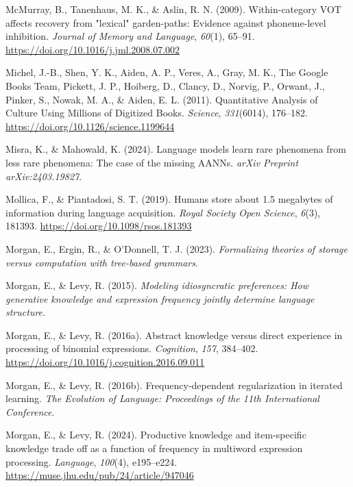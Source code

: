 \documentclass[
  12pt,
  letterpaper,
]{scrreprt}
\newlength{\cslhangindent}
\newenvironment{CSLReferences}[2] %
 {\begin{list}{}{%
  \setlength{\itemindent}{0pt}
  \setlength{\leftmargin}{0pt}
  \setlength{\parsep}{0pt}
  \ifodd #1
   \setlength{\leftmargin}{\cslhangindent}
   \setlength{\itemindent}{-1\cslhangindent}
  \fi
  \setlength{\itemsep}{#2\baselineskip}}}
 {\end{list}}
\begin{document}
\begin{CSLReferences}{1}{0}
McMurray, B., Tanenhaus, M. K., \& Aslin, R. N. (2009). Within-category
VOT affects recovery from {"}lexical{"} garden-paths: Evidence against
phoneme-level inhibition. \emph{Journal of Memory and Language},
\emph{60}(1), 65--91. \url{https://doi.org/10.1016/j.jml.2008.07.002}

Michel, J.-B., Shen, Y. K., Aiden, A. P., Veres, A., Gray, M. K., The
Google Books Team, Pickett, J. P., Hoiberg, D., Clancy, D., Norvig, P.,
Orwant, J., Pinker, S., Nowak, M. A., \& Aiden, E. L. (2011).
Quantitative Analysis of Culture Using Millions of Digitized Books.
\emph{Science}, \emph{331}(6014), 176--182.
\url{https://doi.org/10.1126/science.1199644}

Misra, K., \& Mahowald, K. (2024). Language models learn rare phenomena
from less rare phenomena: The case of the missing AANNs. \emph{arXiv
Preprint arXiv:2403.19827}.

Mollica, F., \& Piantadosi, S. T. (2019). Humans store about 1.5
megabytes of information during language acquisition. \emph{Royal
Society Open Science}, \emph{6}(3), 181393.
\url{https://doi.org/10.1098/rsos.181393}

Morgan, E., Ergin, R., \& O'Donnell, T. J. (2023). \emph{Formalizing
theories of storage versus computation with tree-based grammars}.

Morgan, E., \& Levy, R. (2015). \emph{Modeling idiosyncratic
preferences: How generative knowledge and expression frequency jointly
determine language structure.}

Morgan, E., \& Levy, R. (2016a). Abstract knowledge versus direct
experience in processing of binomial expressions. \emph{Cognition},
\emph{157}, 384--402.
\url{https://doi.org/10.1016/j.cognition.2016.09.011}

Morgan, E., \& Levy, R. (2016b). Frequency-dependent regularization in
iterated learning. \emph{The Evolution of Language: Proceedings of the
11th International Conference}.

Morgan, E., \& Levy, R. (2024). Productive knowledge and item-specific
knowledge trade off as a function of frequency in multiword expression
processing. \emph{Language}, \emph{100}(4), e195--e224.
\url{https://muse.jhu.edu/pub/24/article/947046}


\end{CSLReferences}
\end{document}
